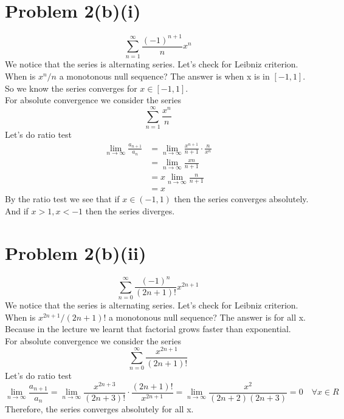 \documentclass{article}
\begin{document}
\section*{Problem 2(b)(i)}
\[
   \sum_{n=1}^{\infty} \frac{(-1)^{n+1}}{n}x^n
\]
We notice that the series is alternating series. Let's check for Leibniz criterion. \\
When is \(x^n/n\) a monotonous null sequence? The answer is when x is in \([-1, 1]\). \\
So we know the series converges for \(x \in [-1, 1]\). \\
For absolute convergence we consider the series
\[
   \sum_{n=1}^{\infty} \frac{x^n}{n}
\]
Let's do ratio test
\begin{align*}
   \lim_{n \rightarrow \infty} \frac{a_{n+1}}{a_n} &= \lim_{n \rightarrow \infty} \frac{x^{n+1}}{n+1} \cdot \frac{n}{x^n} \\
               &= \lim_{n \rightarrow \infty} \frac{x n}{n+1} \\
               &= x \lim_{n \rightarrow \infty} \frac{n}{n+1} \\
               &= x
\end{align*}
By the ratio test we see that if \(x \in (-1, 1)\) then the series converges absolutely. \\
And if \(x > 1, x < -1\) then the series diverges. \\


\section*{Problem 2(b)(ii)}
\[
   \sum_{n=0}^{\infty} \frac{(-1)^n}{(2n+1)!}x^{2n+1}
\]
We notice that the series is alternating series. Let's check for Leibniz criterion. \\
When is \(x^{2n+1}/(2n+1)!\) a monotonous null sequence? The answer is for all x.
Because in the lecture we learnt that factorial grows faster than exponential. \\
For absolute convergence we consider the series
\[
   \sum_{n=0}^{\infty} \frac{x^{2n+1}}{(2n+1)!}
\]
Let's do ratio test
\[
   \lim_{n \rightarrow \infty} \frac{a_{n+1}}{a_n} = \lim_{n \rightarrow \infty} \frac{x^{2n+3}}{(2n+3)!} \cdot \frac{(2n+1)!}{x^{2n+1}} = \lim_{n \rightarrow \infty} \frac{x^2}{(2n+2)(2n+3)} = 0 \quad \forall x \in R
\]
Therefore, the series converges absolutely for all x.
\end{document}
